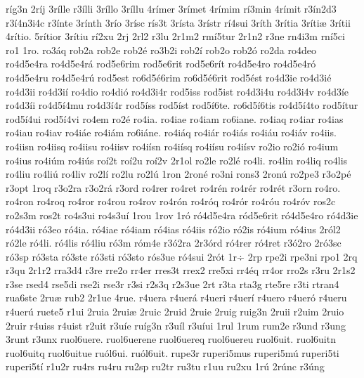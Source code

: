 {r^^edg3n
2r^^edj
3r^^edlle
r3^^edlli
3r^^edllo
3r^^edllu
4r^^edmer
3r^^edmet
4r^^edmim
r^^ed3min
4r^^edmit
r3^^edn2d3
r3^^ed4n3i4c
r3^^ednte
3r^^ednth
3r^^edo
3r^^edsc
r^^eds3t
3r^^edsta
3r^^edstr
r^^ed4sui
3r^^edth
3r^^edtia
3r^^edti^^e6
3r^^edtii
4r^^edtio.
5r^^edtior
3r^^edtiu
r^^ed2xu
2rj
2rl2
r3lu
2r1m2
rm^^ed5tur
2r1n2
r3ne
rn4i3m
rn^^ed5ci
ro1
1ro.
ro3^^e1q
rob2a
rob2e
rob2^^e9
ro3b2i
rob2^^ed
rob2o
rob2^^f3
ro2da
ro4deo
ro4d5e4ra
ro4d5e4r^^e1
rod5e6rim
rod5e6rit
rod5e6r^^edt
ro4d5e4ro
ro4d5e4r^^f3
ro4d5e4ru
ro4d5e4r^^fa
rod5est
ro6d5^^e96rim
ro6d5^^e96rit
rod5^^e9st
ro4d3ie
ro4d3i^^e9
ro4d3ii
ro4d3i^^ed
ro4dio
ro4di^^f3
ro4d3i4r
rod5iss
rod5ist
ro4d3i4u
ro4d3i4v
ro4d3^^ede
ro4d3^^edi
ro4d5^^ed4mu
ro4d3^^ed4r
rod5^^edss
rod5^^edst
rod5^^ed6te.
ro6d5^^ed6tis
ro4d5^^ed4to
rod5^^edtur
rod5^^ed4ui
rod5^^ed4vi
ro4em
ro2^^e9
ro4ia.
ro4iae
ro4iam
ro6iane.
ro4iaq
ro4iar
ro4ias
ro4iau
ro4iav
ro4i^^e1e
ro4i^^e1m
ro6i^^e1ne.
ro4i^^e1q
ro4i^^e1r
ro4i^^e1s
ro4i^^e1u
ro4i^^e1v
ro4iis.
ro4iisn
ro4iisq
ro4iisu
ro4iisv
ro4i^^edsn
ro4i^^edsq
ro4i^^edsu
ro4i^^edsv
ro2io
ro2i^^f3
ro4ium
ro4ius
ro4i^^fam
ro4i^^fas
ro^^ed2t
ro^^ed2u
ro^^ed2v
2r1ol
ro2le
ro2l^^e9
ro4li.
ro4lin
ro4liq
ro4lis
ro4liu
ro4li^^fa
ro4liv
ro2l^^ed
ro2lu
ro2l^^fa
1ron
2ron^^e9
ro3ni
rons3
2ron^^fa
ro2pe3
r3o2p^^e9
r3opt
1roq
r3o2ra
r3o2r^^e1
r3ord
ro4rer
ro4ret
ro4r^^e9n
ro4r^^e9r
ro4r^^e9t
r3orn
ro4ro.
ro4ron
ro4roq
ro4ror
ro4rou
ro4rov
ro4r^^f3n
ro4r^^f3q
ro4r^^f3r
ro4r^^f3u
ro4r^^f3v
ros2c
ro2s3m
ros2t
ro4s3ui
ro4s3u^^ed
1rou
1rov
1r^^f3
r^^f34d5e4ra
r^^f3d5e6rit
r^^f34d5e4ro
r^^f34d3ie
r^^f34d3ii
r^^f33eo
r^^f34ia.
r^^f34iae
r^^f34iam
r^^f34ias
r^^f34iis
r^^f32io
r^^f32is
r^^f34ium
r^^f34ius
2r^^f3l2
r^^f32le
r^^f34li.
r^^f34lis
r^^f34liu
r^^f33m
r^^f3m4e
r3^^f32ra
2r3^^f3rd
r^^f34rer
r^^f34ret
r3^^f32ro
2r^^f33sc
r^^f33sp
r^^f33sta
r^^f33ste
r^^f33sti
r^^f33sto
r^^f3s3ue
r^^f34sui
2r^^f3t
1r^^f7
2rp
rpe2i
rpe3ni
rpo1
2rq
r3qu
2r1r2
rra3d4
r3re
rre2o
rr4er
rres3t
rrex2
rre5xi
rr4^^e9q
rr4or
rro2s
r3ru
2r1s2
r3se
rsed4
rse5di
rse2i
rse3r
r3si
r2s3q
r2s3ue
2rt
r3ta
rta3g
rte5re
r3ti
rtran4
rua6ste
2ru^^e6
rub2
2r1ue
4rue.
r4uera
r4uer^^e1
r4ueri
r4uer^^ed
r4uero
r4uer^^f3
r4ueru
r4uer^^fa
ruete5
r1ui
2ruia
2rui^^e6
2ruic
2ruid
2ruie
2ruig
ruig3n
2ruii
r2uim
2ruio
2ruir
r4uiss
r4uist
r2uit
r3u^^ede
ru^^edg3n
r3u^^edl
r3u^^edui
1rul
1rum
rum2e
r3und
r3ung
3runt
r3unx
ruol6uere.
ruol6uerene
ruol6uereq
ruol6uereu
ruol6uit.
ruol6uitn
ruol6uitq
ruol6uitue
ru^^f3l6ui.
ru^^f3l6uit.
rupe3r
ruperi5mus
ruperi5m^^fa
ruperi5ti
ruperi5t^^ed
r1u2r
ru4rs
ru4ru
ru2sp
ru2tr
ru3tu
r1uu
ru2xu
1r^^fa
2r^^fanc
r3^^fang
}
